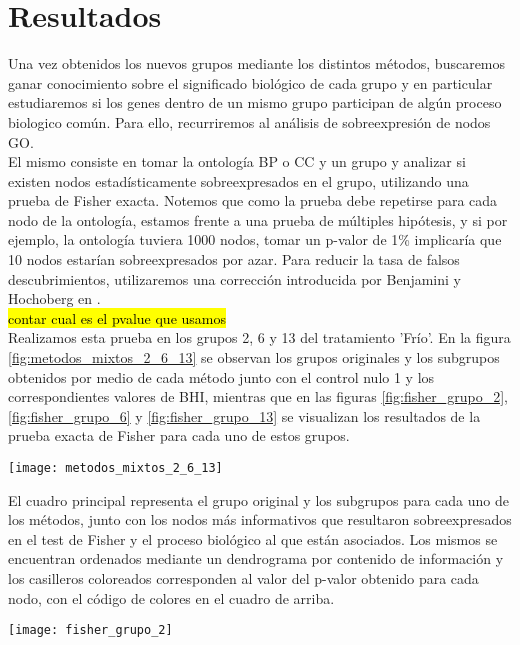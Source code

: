\section{Resultados}
Una vez obtenidos los nuevos grupos mediante los distintos métodos, buscaremos ganar conocimiento sobre el significado biológico de cada grupo y en particular estudiaremos si los genes dentro de un mismo grupo participan de algún proceso biologico común. Para ello, recurriremos al análisis de sobreexpresión de nodos GO.\\
El mismo consiste en tomar la ontología BP o CC y un grupo y analizar si existen nodos estadísticamente sobreexpresados en el grupo, utilizando una prueba de Fisher exacta. Notemos que como la prueba debe repetirse para cada nodo de la ontología, estamos frente a una prueba de múltiples hipótesis, y si por ejemplo, la ontología tuviera 1000 nodos, tomar un p-valor de 1\% implicaría que 10 nodos estarían sobreexpresados por azar. Para reducir la tasa de falsos descubrimientos, utilizaremos una corrección introducida por Benjamini y Hochoberg en \cite{Hochberg1995}.\\
\hl{contar cual es el pvalue que usamos}\\
Realizamos esta prueba en los grupos 2, 6 y 13 del tratamiento 'Frío'. En la figura \ref{fig:metodos_mixtos_2_6_13} se observan los grupos originales y los subgrupos obtenidos por medio de cada método junto con el control nulo 1 y los correspondientes valores de BHI, mientras que en las figuras \ref{fig:fisher_grupo_2}, \ref{fig:fisher_grupo_6} y \ref{fig:fisher_grupo_13} se visualizan los resultados de la prueba exacta de Fisher para cada uno de estos grupos. 

\begin{center}
\texttt{[image: metodos\_mixtos\_2\_6\_13]}
\label{fig:metodos_mixtos_2_6_13}
\end{center}

El cuadro principal representa el grupo original y los subgrupos para cada uno de los métodos, junto con los nodos más informativos que resultaron sobreexpresados en el test de Fisher y el proceso biológico al que están asociados. Los mismos se encuentran ordenados mediante un dendrograma por contenido de información y los casilleros coloreados corresponden al valor del p-valor obtenido para cada nodo, con el código de colores en el cuadro de arriba.

\begin{center}
\texttt{[image: fisher\_grupo\_2]}
\label{fig:fisher_grupo_2}
\end{center}


